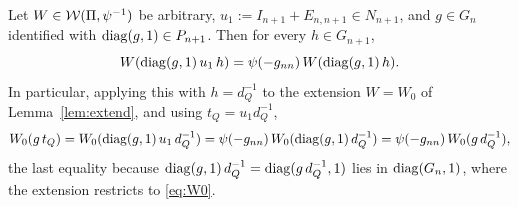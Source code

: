 \begin{qtwolemma}\label{lem:u1translate}
Let $W\in\mathcal{W}(\Pi,\psi^{-1})$ be arbitrary, $u_1:=I_{n+1}+E_{n,n+1}\in N_{n+1}$, and
$g\in G_n$ identified with $\operatorname{diag}(g,1)\in P_{n+1}$. Then for every $h\in G_{n+1}$,
\[
W(\operatorname{diag}(g,1)\,u_1\,h)=\psi(-g_{nn})\,W(\operatorname{diag}(g,1)\,h).
\]
In particular, applying this with $h=d_Q^{-1}$ to the extension $W=W_0$ of
Lemma~\ref{lem:extend}, and using $t_Q=u_1 d_Q^{-1}$,
\[
W_0(g\,t_Q)=W_0(\operatorname{diag}(g,1)\,u_1\,d_Q^{-1})=\psi(-g_{nn})\,W_0(\operatorname{diag}(g,1)\,d_Q^{-1})
=\psi(-g_{nn})\,W_0(g\,d_Q^{-1}),
\]
the last equality because $\operatorname{diag}(g,1)\,d_Q^{-1}=\operatorname{diag}(g\,d_Q^{-1},1)$ lies in
$\operatorname{diag}(G_n,1)$, where the extension restricts to \eqref{eq:W0}.
\end{qtwolemma}

